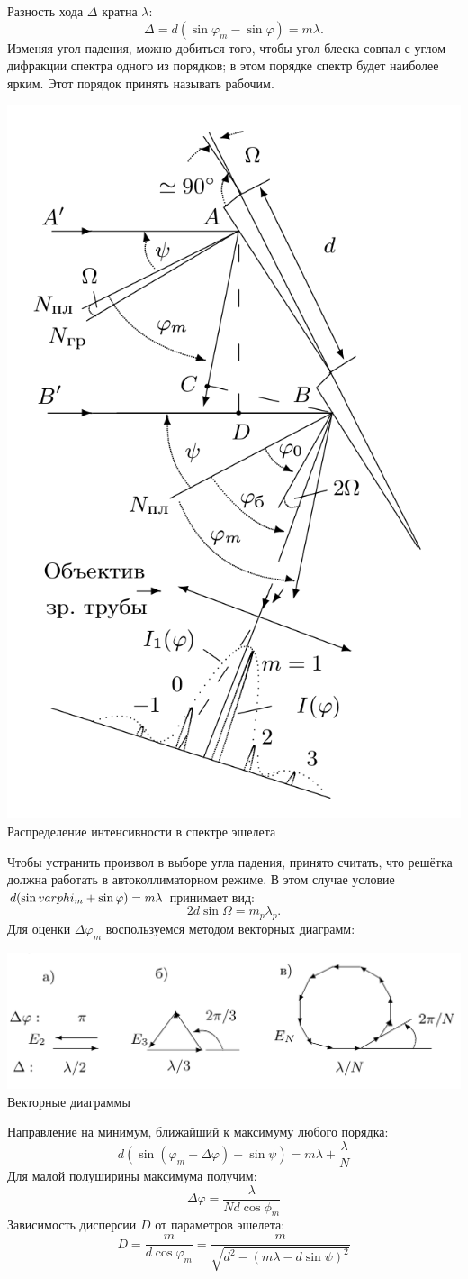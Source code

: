 Разность хода $\Delta$ кратна $\lambda$:
\[
\Delta = d (\sin \varphi_m - \sin \varphi) = m \lambda.
\]
Изменяя угол падения, можно добиться того, чтобы угол блеска совпал с углом дифракции спектра одного из порядков; в этом порядке спектр будет наиболее ярким. Этот порядок принять называть рабочим.
\begin{center}
    \includegraphics[width = 0.5\linewidth]{3.png} \\
    {Распределение интенсивности в спектре эшелета}
\end{center}

Чтобы устранить произвол в выборе угла падения, принято считать, что решётка должна работать в автоколлиматорном режиме. В этом случае условие $d(\sin \\varphi_m + \sin \varphi) = m \lambda$ принимает вид:
\[
    2d \sin \Omega = m_p \lambda_p.
\]
Для оценки $\Delta \varphi_m$ воспользуемся методом векторных диаграмм:
\begin{center}
    \includegraphics[width = 1.0\linewidth]{2.png}
    {Векторные диаграммы}
\end{center}
Направление на минимум, ближайший к максимуму любого порядка:
\[
d(\sin(\varphi_m + \Delta \varphi) + \sin \psi) = m \lambda + \frac{\lambda}{N}
\]
Для малой полуширины максимума получим:
\[
\Delta \varphi = \frac{\lambda}{Nd\cos \phi_m}
\]
Зависимость дисперсии $D$ от параметров эшелета:
\[
D = \frac{m}{d \cos \varphi_m} = \frac{m}{\sqrt{d^2 - (m \lambda - d \sin \psi)^2}}
\]

